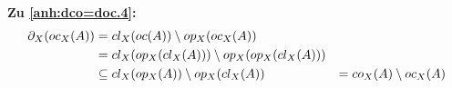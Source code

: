 \noindent
\textbf{Zu \ref{anh:dco=doc.4}:}
	\begin{align*}
		\partial_X(oc_X(A)) &= cl_X(oc(A)) \setminus op_X(oc_X(A)) &\\
		&= cl_X(op_X(cl_X(A))) \setminus op_X(op_X(cl_X(A))) &\\
		&\subseteq cl_X(op_X(A)) \setminus op_X(cl_X(A)) & = co_X(A) \setminus oc_X(A)
	\end{align*}




